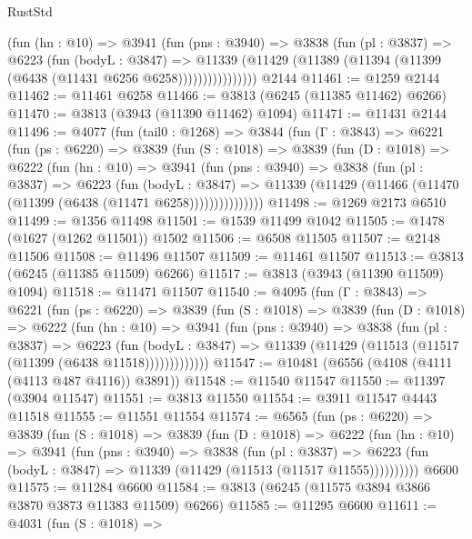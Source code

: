 \begin{lexlean}{RustStd}
\begin{coremodule}
{\begin{coremodule}
{{{{{{{{{{{{{{{{{{{{{{{{{{{{{{{{{{{                (fun (hn : @10) =>
                @3941
                  (fun (pns : @3940) =>
                  @3838
                    (fun (pl : @3837) =>
                    @6223
                      (fun (bodyL : @3847) =>
                      @11339
                        (@11429 (@11389 (@11394 (@11399 (@6438 (@11431 @6256 @6258))))))))))))))))
    @2144
@11461 := @1259 @2144
@11462 := @11461 @6258
@11466 := @3813 (@6245 (@11385 @11462) @6266)
@11470 := @3813 (@3943 (@11390 @11462) @1094)
@11471 := @11431 @2144
@11496 := @4077
    (fun (tail0 : @1268) =>
    @3844
      (fun (Γ : @3843) =>
      @6221
        (fun (ps : @6220) =>
        @3839
          (fun (S : @1018) =>
          @3839
            (fun (D : @1018) =>
            @6222
              (fun (hn : @10) =>
              @3941
                (fun (pns : @3940) =>
                @3838
                  (fun (pl : @3837) =>
                  @6223
                    (fun (bodyL : @3847) =>
                    @11339 (@11429 (@11466 (@11470 (@11399 (@6438 (@11471 @6258)))))))))))))))
@11498 := @1269 @2173 @6510
@11499 := @1356 @11498
@11501 := @1539 @11499 @1042
@11505 := @1478 (@1627 (@1262 @11501)) @1502
@11506 := @6508 @11505
@11507 := @2148 @11506
@11508 := @11496 @11507
@11509 := @11461 @11507
@11513 := @3813 (@6245 (@11385 @11509) @6266)
@11517 := @3813 (@3943 (@11390 @11509) @1094)
@11518 := @11471 @11507
@11540 := @4095
    (fun (Γ : @3843) =>
    @6221
      (fun (ps : @6220) =>
      @3839
        (fun (S : @1018) =>
        @3839
          (fun (D : @1018) =>
          @6222
            (fun (hn : @10) =>
            @3941
              (fun (pns : @3940) =>
              @3838
                (fun (pl : @3837) =>
                @6223
                  (fun (bodyL : @3847) =>
                  @11339 (@11429 (@11513 (@11517 (@11399 (@6438 @11518)))))))))))))
@11547 := @10481 (@6556 (@4108 (@4111 (@4113 @487 @4116)) @3891))
@11548 := @11540 @11547
@11550 := @11397 (@3904 @11547)
@11551 := @3813 @11550
@11554 := @3911 @11547 @4443 @11518
@11555 := @11551 @11554
@11574 := @6565
    (fun (ps : @6220) =>
    @3839
      (fun (S : @1018) =>
      @3839
        (fun (D : @1018) =>
        @6222
          (fun (hn : @10) =>
          @3941
            (fun (pns : @3940) =>
            @3838
              (fun (pl : @3837) =>
              @6223 (fun (bodyL : @3847) => @11339 (@11429 (@11513 (@11517 @11555))))))))))
    @6600
@11575 := @11284 @6600
@11584 := @3813 (@6245 (@11575 @3894 @3866 @3870 @3873 @11383 @11509) @6266)
@11585 := @11295 @6600
@11611 := @4031
    (fun (S : @1018) =>
}}}}}}}}}}}}}}}}}}}}}}}}}}}}}}}}}}}
\end{coremodule}}
\end{coremodule}
\end{lexlean}
